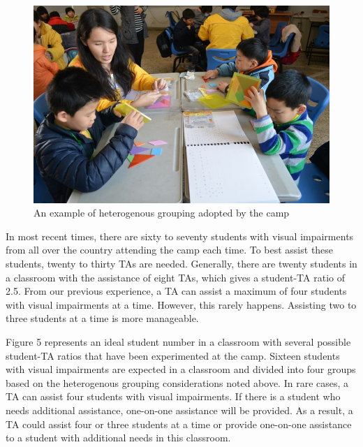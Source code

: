 \documentclass[11.5pt]{sig-alternate} %
\begin{document}
\begin{large}
\begin{figure}[h]
    \centering
    \includegraphics[width=1\linewidth]{Fig4.png}
    \caption{An example of heterogenous grouping adopted by the camp}
\end{figure}

In most recent times, there are sixty to seventy students with visual impairments from all over the country attending the camp each time. To best assist these students, twenty to thirty TAs are needed. Generally, there are twenty students in a classroom with the assistance of eight TAs, which gives a student-TA ratio of 2.5. From our previous experience, a TA can assist a maximum of four students with visual impairments at a time. However, this rarely happens. Assisting two to three students at a time is more manageable.

Figure 5 represents an ideal student number in a classroom with several possible student-TA ratios that have been experimented at the camp. Sixteen students with visual impairments are expected in a classroom and divided into four groups based on the heterogenous grouping considerations noted above. In rare cases, a TA can assist four students with visual impairments. If there is a student who needs additional assistance, one-on-one assistance will be provided. As a result, a TA could assist four or three students at a time or provide one-on-one assistance to a student with additional needs in this classroom.


\end{large}
\end{document}
